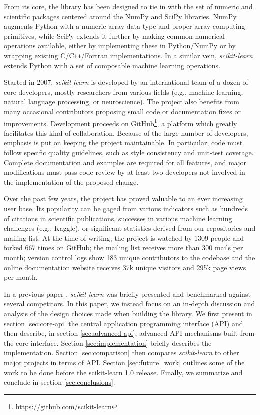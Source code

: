 \documentclass{llncs}
\newcommand{\sklearn}{\textit{scikit-learn}\xspace}
\begin{document}
From its core, the library has been designed to tie in with the set of numeric
and scientific packages centered around the NumPy and SciPy libraries. NumPy
\citep{vanderwalt2011} augments Python with a numeric array data type and proper
array computing primitives, while SciPy \citep{varoquaux2013scipy} extends it
further by making common numerical operations available, either by implementing
these in Python/NumPy or by wrapping existing C/C{}\verb!++!/Fortran
implementations. In a similar vein, \sklearn extends Python with a set of
composable machine learning operations.

Started in 2007, \sklearn is developed by an international team of a dozen of
core developers, mostly researchers from various fields (e.g., machine learning,
natural language processing, or neuroscience). The project also benefits
from many occasional contributors proposing small code or documentation fixes or
improvements. Development proceeds on GitHub\footnote{\url{https://github.com/scikit-learn}},
a platform which greatly facilitates this kind of
collaboration. Because of the large number of developers, emphasis is
put on keeping the project maintainable. In particular, code must follow
specific quality guidelines, such as style consistency and unit-test coverage.
Complete documentation and examples are required for all features,
and major modifications must pass code review by at least two
developers not involved in the implementation of the proposed change.

Over the past few years, the project has proved valuable to an ever increasing
user base. Its popularity can be gaged from various indicators such as hundreds
of citations in scientific publications, successes in various machine learning
challenges (e.g., Kaggle), or significant statistics derived from our
repositories and mailing list.  At the time of writing, the project is watched
by 1309 people and forked 667 times on GitHub; the mailing list receives more
than 300 mails per month; version control logs
show 183 unique contributors to the codebase and the online documentation
website receives 37k unique visitors and 295k page views per month.

In a previous paper \citep{pedregosa2011}, \sklearn was briefly presented and
benchmarked against several competitors. In this paper, we instead focus on an
in-depth discussion and analysis of the design choices made when building the
library. We first present in section \ref{sec:core-api} the central application
programming interface (API) and then describe, in section \ref{sec:advanced-api},
advanced API mechanisms built from the core interface. Section
\ref{sec:implementation} briefly describes the implementation.
Section \ref{sec:comparison} then
compares \emph{scikit-learn} to other major projects in terms of API.
Section \ref{sec:future_work} outlines some of the work to be done before
the scikit-learn 1.0 release.  Finally, we summarize and conclude in
section \ref{sec:conclusions}.
\end{document}
